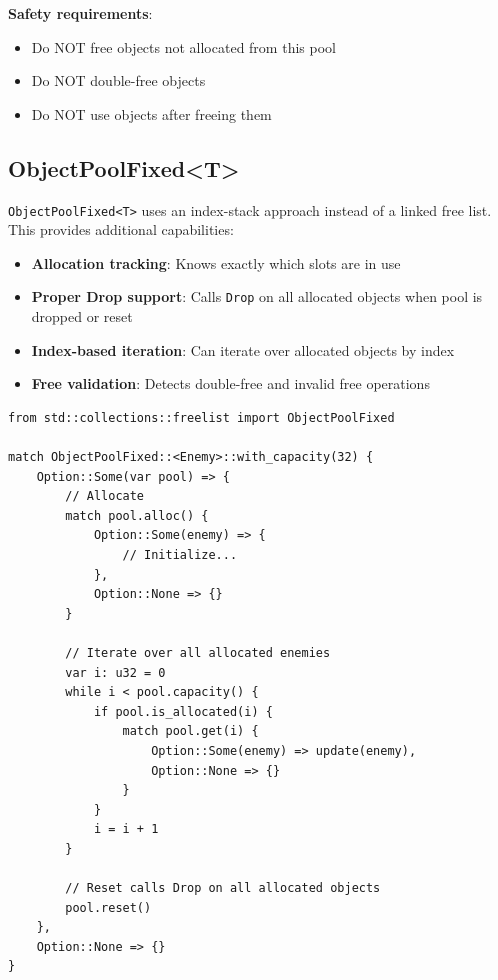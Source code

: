 \begin{warningbox}
\textbf{Safety requirements}:
\begin{itemize}
    \item Do NOT free objects not allocated from this pool
    \item Do NOT double-free objects
    \item Do NOT use objects after freeing them
\end{itemize}
\end{warningbox}

\subsection{ObjectPoolFixed<T>}

\texttt{ObjectPoolFixed<T>} uses an index-stack approach instead of a linked free list. This provides additional capabilities:

\begin{itemize}
    \item \textbf{Allocation tracking}: Knows exactly which slots are in use
    \item \textbf{Proper Drop support}: Calls \texttt{Drop} on all allocated objects when pool is dropped or reset
    \item \textbf{Index-based iteration}: Can iterate over allocated objects by index
    \item \textbf{Free validation}: Detects double-free and invalid free operations
\end{itemize}

\begin{lstlisting}
from std::collections::freelist import ObjectPoolFixed

match ObjectPoolFixed::<Enemy>::with_capacity(32) {
    Option::Some(var pool) => {
        // Allocate
        match pool.alloc() {
            Option::Some(enemy) => {
                // Initialize...
            },
            Option::None => {}
        }

        // Iterate over all allocated enemies
        var i: u32 = 0
        while i < pool.capacity() {
            if pool.is_allocated(i) {
                match pool.get(i) {
                    Option::Some(enemy) => update(enemy),
                    Option::None => {}
                }
            }
            i = i + 1
        }

        // Reset calls Drop on all allocated objects
        pool.reset()
    },
    Option::None => {}
}
\end{lstlisting}

